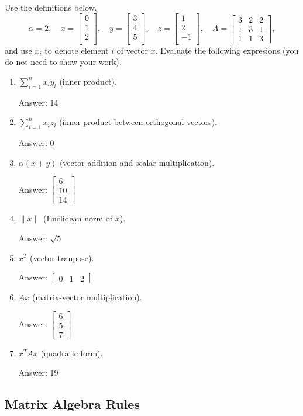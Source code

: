\documentclass{article}
\def\ans#1{\par\gre{Answer: #1}}
\def\blu#1{{\color{blu}#1}}
\def\gre#1{{\color{gre}#1}}
\def\norm#1{\|#1\|}
\def\enum#1{\begin{enumerate}#1\end{enumerate}}
\begin{document}
Use the definitions below,
\[
\alpha = 2,\quad
x = \left[\begin{array}{c}
0\\
1\\
2\\
\end{array}\right], \quad 
y = \left[\begin{array}{c}
3\\
4\\
5\\
\end{array}\right],\quad
z = \left[\begin{array}{c}
1\\
2\\
-1\\
\end{array}\right],\quad
A = \left[\begin{array}{ccc}
3 & 2 & 2\\
1 & 3 & 1\\
1 & 1 & 3
\end{array}\right],
\]
and use $x_i$ to denote element $i$ of vector $x$.
\blu{Evaluate the following expresions} (you do not need to show your work).
\enum{
\item $\sum_{i=1}^n x_iy_i$ (inner product).\ans{14}
\item $\sum_{i=1}^n x_iz_i$ (inner product between orthogonal vectors). \ans{0}
\item $\alpha(x+y)$ (vector addition and scalar multiplication).\ans{$\left[\begin{array}{c} 6\\10\\14\end{array}\right]$}
\item $\norm{x}$ (Euclidean norm of $x$). \ans{$\sqrt{5}$}
\item $x^T$ (vector tranpose). \ans{$\left[\begin{array}{ccc} 0 &1 &2\end{array}\right]$}
\item $Ax$ (matrix-vector multiplication). \ans{$\left[\begin{array}{c} 6\\5\\7\end{array}\right]$}
\item $x^TAx$ (quadratic form). \ans{19}
}

\subsection{Matrix Algebra Rules}
\end{document}
